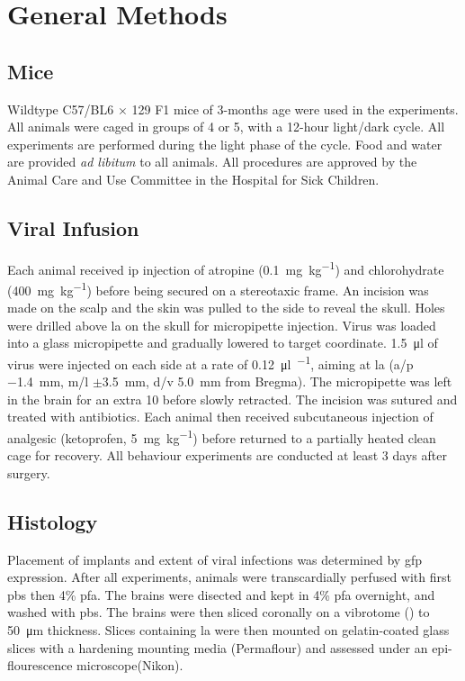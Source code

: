 \chapter{General Methods}

\section{Mice}

Wildtype C57/BL6 $\times$ 129 F1 mice of 3-months age were used in the experiments. All animals were caged in groups of 4 or 5, with a 12-hour light/dark cycle. All experiments are performed during the light phase of the cycle. Food and water are provided \textit{ad libitum} to all animals. All procedures are approved by the Animal Care and Use Committee in the Hospital for Sick Children.

\section{Viral Infusion}\label{methods.viralinfusion}

Each animal received \gls{ip} injection of atropine (\SI{0.1}{\mg\per\kg}) and chlorohydrate (\SI{400}{\mg\per\kg}) before being secured on a stereotaxic frame. An incision was made on the scalp and the skin was pulled to the side to reveal the skull. Holes were drilled above \gls{la} on the skull for micropipette injection. Virus was loaded into a glass micropipette and gradually lowered to target coordinate. \SI{1.5}{\ul} of virus were injected on each side at a rate of \SI{0.12}{\ul\per\min}, aiming at \gls{la} (\gls{a/p} \SI{-1.4}{\mm}, \gls{m/l} $\pm$\SI{3.5}{\mm}, \gls{d/v} \SI{5.0}{\mm} from Bregma). The micropipette was left in the brain for an extra \SI{10}{\min} before slowly retracted. The incision was sutured and treated with antibiotics. Each animal then received subcutaneous injection of analgesic (ketoprofen, \SI{5}{\mg\per\kg}) before returned to a partially heated clean cage for recovery. All behaviour experiments are conducted at least 3 days after surgery.

\section{Histology}
Placement of implants and extent of viral infections was determined by \gls{gfp} expression. After all experiments, animals were transcardially perfused with first \gls{pbs} then 4\% \gls{pfa}. The brains were disected and kept in 4\% \gls{pfa} overnight, and washed with \gls{pbs}. The brains were then sliced coronally on a vibrotome () to \SI{50}{\um} thickness. Slices containing \gls{la} were then mounted on gelatin-coated glass slices with a hardening mounting media (Permaflour) and assessed under an epi-flourescence microscope(Nikon).

